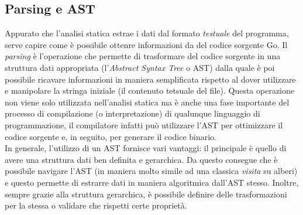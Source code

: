 \subsection{Parsing e AST}
Appurato che l'analisi statica estrae i dati dal formato \emph{testuale} del programma, serve capire come è possibile ottenre informazioni da del codice sorgente Go. Il \emph{parsing} è l'operazione che permette di trasformare del codice sorgente in una struttura dati appropriata (l'\emph{Abstract Syntax Tree} o AST) dalla quale è poi possibile ricavare informazioni in maniera semplificata rispetto al dover utilizzare e manipolare la stringa iniziale (il contenuto tetsuale del file). Questa operazione non viene solo utilizzata nell'analisi statica ma è anche una fase importante del processo di compilazione (o interpretazione) di qualunque linguaggio di programmazione, il compilatore infatti può utilizzare l'AST per ottimizzare il codice sorgente e, in seguito, per generare il codice binario.\\
In generale, l'utilizzo di un AST fornisce vari vantaggi: il principale è quello di avere una struttura dati ben definita e gerarchica. Da questo consegue che è possibile navigare l'AST (in maniera molto simile ad una classica \emph{visita} su alberi) e questo permette di estrarre dati in maniera algoritmica dall'AST stesso. Inoltre, sempre grazie alla struttura gerarchica, è possibile definire delle trasformazioni per la stessa o validare che rispetti certe proprietà.